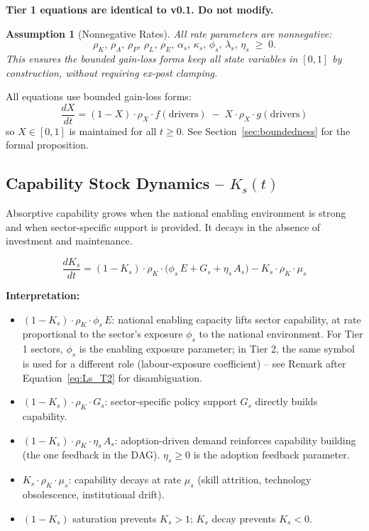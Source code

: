 \documentclass[11pt,a4paper]{article}
\newtheorem{assumption}{Assumption}
\begin{document}
\textbf{Tier 1 equations are identical to v0.1. Do not modify.}

\begin{assumption}[Nonnegative Rates]
All rate parameters are nonnegative:
\[
\rho_K,\, \rho_A,\, \rho_P,\, \rho_L,\, \rho_E,\, \alpha_s,\, \kappa_s,\, \phi_s,\, \lambda_s,\, \eta_s \;\geq\; 0.
\]
This ensures the bounded gain-loss forms keep all state variables in $[0,1]$ by construction, without requiring ex-post clamping.
\end{assumption}

All equations use bounded gain-loss forms:
\[
\frac{dX}{dt} = (1 - X)\cdot\rho_X \cdot f(\text{drivers}) \;-\; X\cdot\rho_X \cdot g(\text{drivers})
\]
so $X \in [0,1]$ is maintained for all $t \geq 0$. See Section~\ref{sec:boundedness} for the formal proposition.

\subsection{Capability Stock Dynamics -- \texorpdfstring{$K_s(t)$}{Ks(t)}}

Absorptive capability grows when the national enabling environment is strong and when sector-specific support is provided. It decays in the absence of investment and maintenance.

\begin{equation}
\boxed{
\frac{dK_s}{dt}
= (1 - K_s)\cdot\rho_K\cdot\bigl(\phi_s\, E + G_s + \eta_s\, A_s\bigr)
- K_s\cdot\rho_K\cdot\mu_s
}
\label{eq:Ks}
\end{equation}

\textbf{Interpretation:}
\begin{itemize}
  \item $(1 - K_s)\cdot\rho_K\cdot\phi_s\, E$: national enabling capacity lifts sector capability, at rate proportional to the sector's exposure $\phi_s$ to the national environment. For Tier 1 sectors, $\phi_s$ is the enabling exposure parameter; in Tier 2, the same symbol is used for a different role (labour-exposure coefficient) -- see Remark after Equation~\eqref{eq:Ls_T2} for disambiguation.
  \item $(1 - K_s)\cdot\rho_K\cdot G_s$: sector-specific policy support $G_s$ directly builds capability.
  \item $(1 - K_s)\cdot\rho_K\cdot\eta_s\, A_s$: adoption-driven demand reinforces capability building (the one feedback in the DAG). $\eta_s \geq 0$ is the adoption feedback parameter.
  \item $K_s\cdot\rho_K\cdot\mu_s$: capability decays at rate $\mu_s$ (skill attrition, technology obsolescence, institutional drift).
  \item $(1 - K_s)$ saturation prevents $K_s > 1$; $K_s$ decay prevents $K_s < 0$.
\end{itemize}
\end{document}
